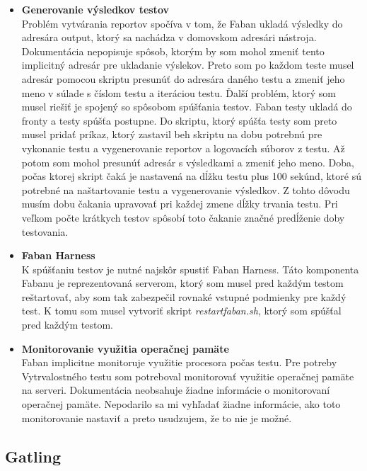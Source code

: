 \documentclass[12pt,oneside,final]{fithesis-utf8}
\newcommand\underscore[1]{\underline{\hspace{8pt}}}
\begin{document}
\begin{itemize}

\item \textbf{Generovanie výsledkov testov}\\
Problém vytvárania reportov spočíva v tom, že Faban ukladá výsledky do adresára output, ktorý sa nachádza v domovskom adresári nástroja. Dokumentácia nepopisuje spôsob, ktorým by som mohol zmeniť tento implicitný adresár pre ukladanie výslekov. Preto som po každom teste musel adresár pomocou skriptu presunúť do adresára daného testu a zmeniť jeho meno v súlade s číslom testu a iteráciou testu. Ďalší problém, ktorý som musel riešiť je spojený so spôsobom spúšťania testov. Faban testy ukladá do fronty a testy spúšťa postupne. Do skriptu, ktorý spúšťa testy som preto musel pridať príkaz, ktorý zastavil beh skriptu na dobu potrebnú pre vykonanie testu a vygenerovanie reportov a logovacích súborov z testu. Až potom som mohol presunúť adresár s výsledkami a zmeniť jeho meno. Doba, počas ktorej skript čaká je nastavená na dĺžku testu plus 100 sekúnd, ktoré sú potrebné na naštartovanie testu a vygenerovanie výsledkov. Z tohto dôvodu musím dobu čakania upravovať pri každej zmene dĺžky trvania testu. Pri veľkom počte krátkych testov spôsobí toto čakanie značné predĺženie doby testovania.

\item \textbf{Faban Harness}\\
K spúšťaniu testov je nutné najskôr spustiť Faban Harness. Táto komponenta Fabanu je reprezentovaná serverom, ktorý som musel pred každým testom reštartovať, aby som tak zabezpečil rovnaké vstupné podmienky pre každý test. K tomu som musel vytvoriť skript \textit{restart\underscore{}faban.sh}, ktorý som spúšťal pred každým testom.\\

\item \textbf{Monitorovanie využitia operačnej pamäte}\\
Faban implicitne monitoruje využitie procesora počas testu. Pre potreby Vytrvalostného testu som potreboval monitorovať využitie operačnej pamäte na serveri. Dokumentácia neobsahuje žiadne informácie o monitorovaní operačnej pamäte. Nepodarilo sa mi vyhľadať žiadne informácie, ako toto monitorovanie nastaviť a preto usudzujem, že to nie je možné.\\

\end{itemize}

\subsection{Gatling}
\end{document}
